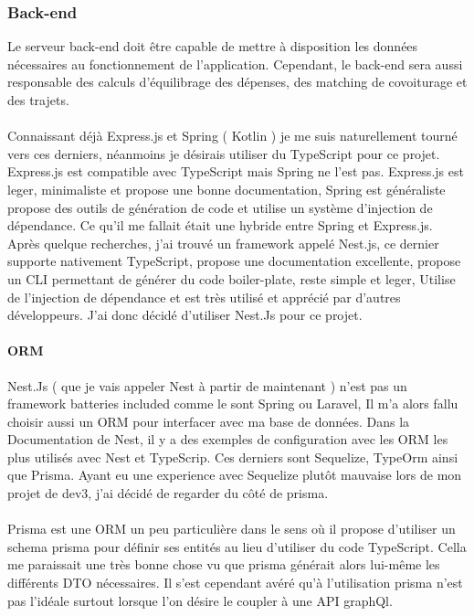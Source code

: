 \subsubsection{Back-end}\label{subsubsec:back-end}
Le serveur back-end doit être capable de mettre à disposition les données nécessaires au fonctionnement de l'application.
Cependant, le back-end sera aussi responsable des calculs d'équilibrage des dépenses, des matching de covoiturage et des trajets.\\\\

Connaissant déjà Express.js et Spring ( Kotlin ) je me suis naturellement tourné vers ces derniers, néanmoins je désirais utiliser du TypeScript pour ce projet.
Express.js est compatible avec TypeScript mais Spring ne l'est pas.
Express.js est leger, minimaliste et propose une bonne documentation,
Spring est généraliste propose des outils de génération de code et utilise un système d'injection de dépendance.
Ce qu'il me fallait était une hybride entre Spring et Express.js.
Après quelque recherches, j'ai trouvé un framework appelé Nest.js, ce dernier supporte nativement TypeScript, propose une documentation excellente,
propose un CLI permettant de générer du code boiler-plate, reste simple et leger, Utilise de l'injection de dépendance et est très utilisé et apprécié par d'autres développeurs.
J'ai donc décidé d'utiliser Nest.Js pour ce projet.

\paragraph{ORM}
Nest.Js ( que je vais appeler Nest à partir de maintenant ) n'est pas un framework batteries included comme le sont Spring ou Laravel,
Il m'a alors fallu choisir aussi un ORM pour interfacer avec ma base de données.
Dans la Documentation de Nest, il y a des exemples de configuration avec les ORM les plus utilisés avec Nest et TypeScrip.
Ces derniers sont Sequelize, TypeOrm ainsi que Prisma.
Ayant eu une experience avec Sequelize plutôt mauvaise lors de mon projet de dev3, j'ai décidé de regarder du côté de prisma.\\\\

Prisma est une ORM un peu particulière dans le sens où il propose d'utiliser un schema prisma pour définir ses entités au lieu d'utiliser du code TypeScript.
Cella me paraissait une très bonne chose vu que prisma générait alors lui-même les différents DTO nécessaires.
Il s'est cependant avéré qu'à l'utilisation prisma n'est pas l'idéale surtout lorsque l'on désire le coupler à une API graphQl.\\

